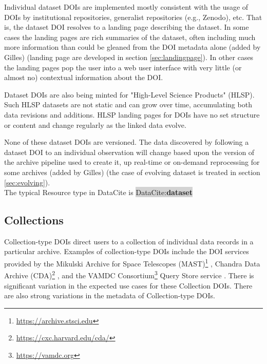 \documentclass[11pt,a4paper]{ivoa}
\newcommand{\dataciteterm}[1]{\colorbox{lightgray}{DataCite:\textbf{#1}}}
\begin{document}
Individual dataset DOIs are implemented mostly consistent with the usage of DOIs by institutional repositories, generalist repositories (e.g., Zenodo), etc.
That is, the dataset DOI resolves to a landing page describing the dataset.
In some cases the landing pages are rich summaries of the dataset, often including much more information than could be gleaned from the DOI metadata alone {\color{red}(added by Gilles) (landing page are developed in section \ref{sec:landingpage})}.
In other cases the landing pages pop the user into a web user interface with very little (or almost no) contextual information about the DOI. 

Dataset DOIs are also being minted for "High-Level Science Products" (HLSP). 
Such HLSP datasets are not static and can grow over time, accumulating both data revisions and additions.
HLSP landing pages for DOIs have no set structure or content and change regularly as the linked data evolve.

None of these dataset DOIs are versioned. 
The data discovered by following a dataset DOI to an individual observation will change based upon the version of the archive pipeline used to create it, up real-time or on-demand reprocessing for some archives {\color{red}(added by Gilles) (the case of evolving dataset is treated in section \ref{sec:evolving})}.\\

The typical Resource type in DataCite is \dataciteterm{dataset}

\subsection{Collections}
\label{sec:intro:collections}


Collection-type DOIs direct users to a collection of individual data records in a particular archive.
Examples of collection-type DOIs include the DOI services provided by the Mikulski Archive for Space Telescopes (MAST)\footnote{\url{https://archive.stsci.edu}} \citep{2018ApJS..236...20N}, Chandra Data Archive (CDA)\footnote{\url{https://cxc.harvard.edu/cda/}} \citep{2018EPJWC.18612011R}, and the VAMDC Consortium\footnote{\url{https://vamdc.org}} Query Store service \citep{2018Galax...6..105M}.  
There is significant variation in the expected use cases for these Collection DOIs. 
There are also strong variations in the metadata of Collection-type DOIs.
\end{document}

